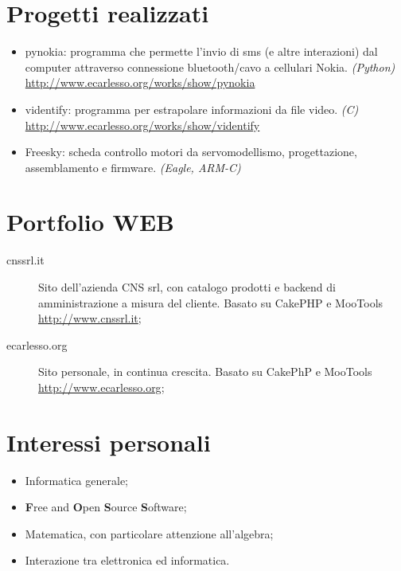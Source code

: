 \documentclass[pdftex, a4paper, 11pt]{article}
\begin{document}
\section*{Progetti realizzati}
\begin{itemize}
\item pynokia: programma che permette l'invio di sms (e
  altre interazioni) dal computer attraverso connessione
  bluetooth/cavo a cellulari Nokia. {\em (Python)}\\
  \url{http://www.ecarlesso.org/works/show/pynokia}
\item videntify: programma per estrapolare informazioni da
  file video. {\em (C)}\\
  \url{http://www.ecarlesso.org/works/show/videntify}
\item Freesky: scheda controllo motori da servomodellismo,
  progettazione, assemblamento e firmware. {\em (Eagle, ARM-C)}\\
\end{itemize}

\section*{Portfolio WEB}
\begin{description}
\item[cnssrl.it] Sito dell'azienda CNS srl, con catalogo prodotti
  e backend di amministrazione a misura del cliente. Basato su CakePHP
  e MooTools\\
  \url{http://www.cnssrl.it};
\item[ecarlesso.org] Sito personale, in continua crescita. Basato
  su CakePhP e MooTools\\
  \url{http://www.ecarlesso.org};
\end{description}

\section*{Interessi personali}
\begin{itemize}
\item Informatica generale;
\item {\bf F}ree and {\bf O}pen {\bf S}ource {\bf S}oftware;
\item Matematica, con particolare attenzione all'algebra;
\item Interazione tra elettronica ed informatica.
\end{itemize}
\end{document}
